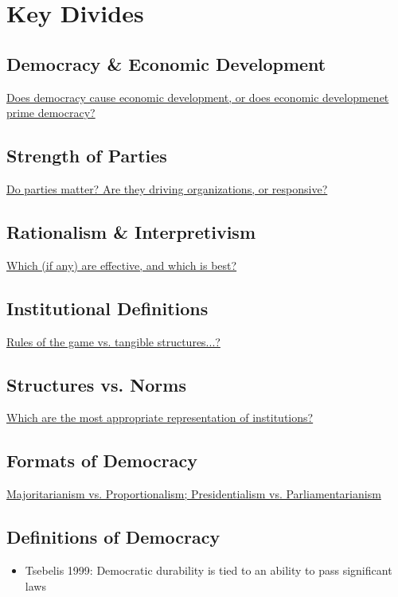 \documentclass[12pt]{article}
\begin{document}
\section*{Key Divides}


\subsection*{Democracy \& Economic Development}
\underline{Does democracy cause economic development, or does economic developmenet prime democracy?}






\subsection*{Strength of Parties}
\underline{Do parties matter? Are they driving organizations, or responsive?}






\subsection*{Rationalism \& Interpretivism}
\underline{Which (if any) are effective, and which is best?}






\subsection*{Institutional Definitions}
\underline{Rules of the game vs. tangible structures...?}






\subsection*{Structures vs. Norms}
\underline{Which are the most appropriate representation of institutions?}






\subsection*{Formats of Democracy}
\underline{Majoritarianism vs. Proportionalism; Presidentialism vs. Parliamentarianism}






\subsection*{Definitions of Democracy}

\begin{itemize}
    \item Tsebelis 1999: Democratic durability is tied to an ability to pass significant laws
\end{itemize}
\end{document}
